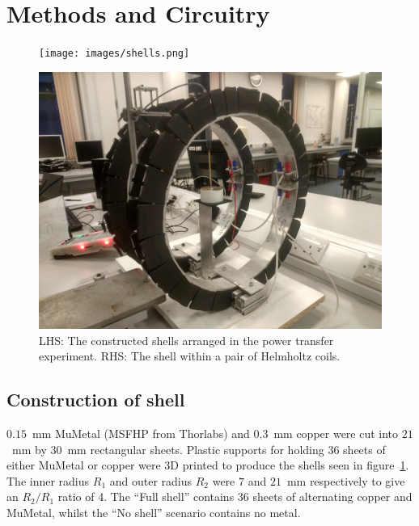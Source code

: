 \documentclass[11pt]{iopart}
\begin{document}
\section{Methods and Circuitry}
\begin{figure}
\begin{center}
    \begin{minipage}{0.315\textwidth}
        \noindent\texttt{[image: images/shells.png]}
    \end{minipage}
    \begin{minipage}{0.553\textwidth}
        \noindent\includegraphics[width=\linewidth]{images/helm.png}
    \end{minipage}
\caption{LHS: The constructed shells arranged in the power transfer
  experiment. RHS: The shell within a pair of Helmholtz coils.}
\label{fig:shells}
\end{center}
\end{figure}

\subsection{Construction of shell}
$0.15$~mm MuMetal (MSFHP from Thorlabs) and $0.3$~mm copper were cut
into $21$~mm by $30$~mm rectangular sheets.  Plastic supports for
holding $36$ sheets of either MuMetal or copper were 3D printed to
produce the shells seen in figure~\ref{fig:shells}. The inner radius
$R_1$ and outer radius $R_2$ were $7$ and $21$~mm respectively to give
an $R_2/R_1$ ratio of 4. The ``Full shell'' contains $36$ sheets of
alternating copper and MuMetal, whilst the ``No shell'' scenario
contains no metal. \\
\end{document}
